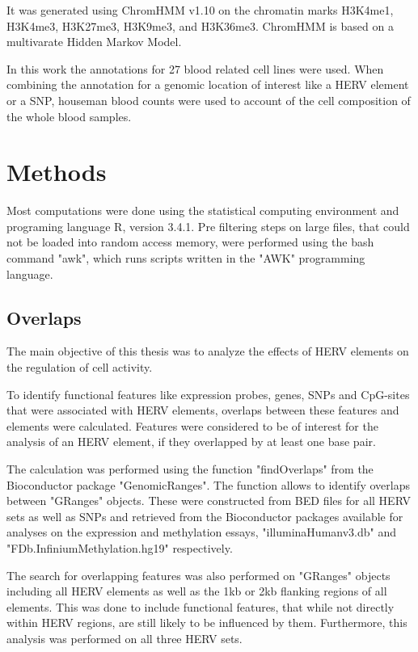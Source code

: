\documentclass[a4paper,12pt,twoside,openright]{article}
\let\oldsection\section
\def\section{\cleardoublepage\oldsection}
\begin{document}
It was generated using ChromHMM v1.10\cite{10.1038/nmeth.1906} on the chromatin marks H3K4me1, H3K4me3, H3K27me3, H3K9me3, and H3K36me3. ChromHMM is based on a multivarate Hidden Markov Model. 

In this work the annotations for 27 blood related cell lines were used. When combining the annotation for a genomic location of interest like a HERV element or a SNP, houseman blood counts were used to account of the cell composition of the whole blood samples. 


\newpage
\section{Methods}
\label{Methods}
Most computations were done using the statistical computing environment and programing language R, version 3.4.1\cite{Rlanguage}. Pre filtering steps on large files, that could not be loaded into random access memory, were performed using the bash command "awk", which runs scripts written in the "AWK" programming language.

\subsection{Overlaps}
\label{Methods:Overlaps}
The main objective of this thesis was to analyze the effects of HERV elements on the regulation of cell activity. 

To identify functional features like expression probes, genes, SNPs and CpG-sites that were associated with HERV elements, overlaps between these features and elements were calculated. Features were considered to be of interest for the analysis of an HERV element, if they overlapped by at least one base pair.

The calculation was performed using the function "findOverlaps" from the Bioconductor package "GenomicRanges"\cite{10.1371/journal.pcbi.1003118}. The function allows to identify overlaps between "GRanges" objects. These were constructed from BED files for all HERV sets as well as SNPs and retrieved from the Bioconductor packages available for analyses on the expression and methylation essays, "illuminaHumanv3.db"\cite{illuminaHumanv3.db} and "FDb.InfiniumMethylation.hg19"\cite{FDb.InfiniumMethylation.hg19} respectively.

The search for overlapping features was also performed on "GRanges" objects including all HERV elements as well as the 1kb or 2kb flanking regions of all elements. This was done to include functional features, that while not directly within HERV regions, are still likely to be influenced by them. Furthermore, this analysis was performed on all three HERV sets.
\end{document}
